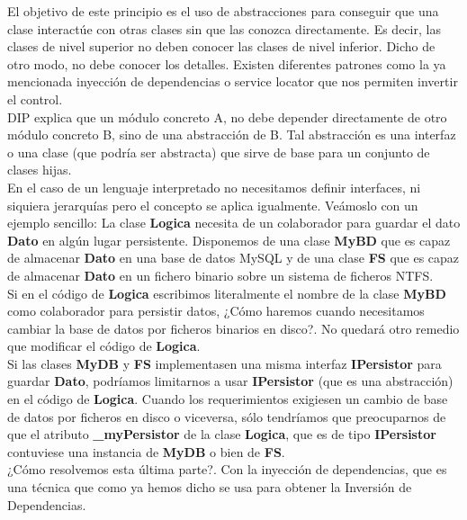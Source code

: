 \documentclass[../pfc.tex]{subfiles}
\begin{document}
	El objetivo de este principio es el uso de abstracciones para conseguir que una clase interactúe con otras clases sin que las conozca directamente. Es decir, las clases de nivel superior no deben conocer las clases de nivel inferior. Dicho de otro modo, no debe conocer los detalles. Existen diferentes patrones como la ya mencionada inyección de dependencias o service locator que nos permiten invertir el control.\\
		
	DIP explica que un módulo concreto A, no debe depender directamente de otro módulo concreto B, sino de una abstracción de B. Tal abstracción es una interfaz o una clase (que podría ser abstracta) que sirve de base para un conjunto de clases hijas.\\
	
	En el caso de un lenguaje interpretado no necesitamos definir interfaces, ni siquiera jerarquías pero el concepto se aplica igualmente. Veámoslo con un ejemplo sencillo: La clase \textbf{Logica} necesita de un colaborador para guardar el dato \textbf{Dato} en algún lugar persistente. Disponemos de una clase \textbf{MyBD} que es capaz de almacenar \textbf{Dato} en una base de datos MySQL y de una clase \textbf{FS} que es capaz de almacenar \textbf{Dato} en un fichero binario sobre un sistema de ficheros NTFS.\\
	
	Si en el código de \textbf{Logica} escribimos literalmente el nombre de la clase \textbf{MyBD} como colaborador para persistir datos, ¿Cómo haremos cuando necesitamos cambiar la base de datos por ficheros binarios en disco?. No quedará otro remedio que modificar el código de \textbf{Logica}.\\
	
	Si las clases \textbf{MyDB} y \textbf{FS} implementasen una misma interfaz \textbf{IPersistor} para guardar \textbf{Dato}, podríamos limitarnos a usar \textbf{IPersistor} (que es una abstracción) en el código de \textbf{Logica}. Cuando los requerimientos exigiesen un cambio de base de datos por ficheros en disco o viceversa, sólo tendríamos que preocuparnos de que el atributo \textbf{\_myPersistor} de la clase \textbf{Logica}, que es de tipo \textbf{IPersistor} contuviese una instancia de \textbf{MyDB} o bien de \textbf{FS}.\\
	
	¿Cómo resolvemos esta última parte?. Con la inyección de dependencias, que es una técnica que como ya hemos dicho se usa para obtener la Inversión de Dependencias.\\
	
\end{document}
